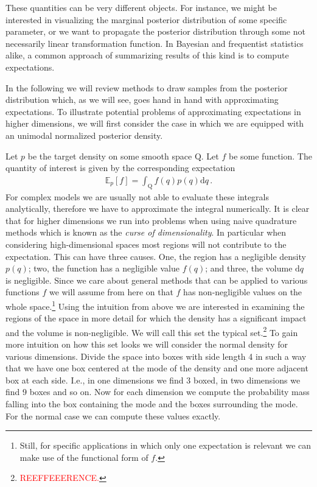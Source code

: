 \newpage
These quantities can be very different objects.
For instance, we might be interested in visualizing the marginal posterior distribution
of some specific parameter, or we want to propagate the posterior distribution
through some not necessarily linear transformation function.
In Bayesian and frequentist statistics alike, a common approach of summarizing
results of this kind is to compute expectations.

In the following we will review methods to draw samples from the posterior
distribution which, as we will see, goes hand in hand with approximating expectations.
To illustrate potential problems of approximating expectations in higher dimensions,
we will first consider the case in which we are equipped with an unimodal normalized posterior density.

Let $p$ be the target density on some smooth space $\mathrm{Q}$.
Let $f$ be some function.
The quantity of interest is given by the corresponding expectation
\begin{align}
    \mathbb{E}_p \left[f\right] = \int_{\mathrm{Q}} f(q) p(q) \mathrm{d}q \,.
\end{align}
For complex models we are usually not able to evaluate these integrals analytically,
therefore we have to approximate the integral numerically.
It is clear that for higher dimensions we run into problems when using naive
quadrature methods which is known as the \emph{curse of dimensionality}.
In particular when considering high-dimensional spaces most regions will not
contribute to the expectation. This can have three causes. One, the region has a
negligible density $p(q)$; two, the function has a negligible value $f(q)$;
and three, the volume $\mathrm{d}q$ is negligible. Since we care about general
methods that can be applied to various functions $f$ we will assume from here on
that $f$ has non-negligible values on the whole space.\footnote{Still, for specific applications
in which only one expectation is relevant we can make use of the functional form of
$f$.}
Using the intuition from above we are interested in examining the regions of the
space in more detail for which the density has a significant impact and the
volume is non-negligible. We will call this set the typical set.\footnote{\textcolor{red}{REEFFEEERENCE.}}
To gain more intuition on how this set looks we will consider the normal density
for various dimensions. Divide the space into boxes with
side length 4 in such a way that we have one box centered at the mode of the
density and one more adjacent box at each side. I.e., in one dimensions we
find 3 boxed, in two dimensions we find 9 boxes and so on. Now for each dimension
we compute the probability mass falling into the box containing the mode and the
boxes surrounding the mode. For the normal case we can compute these values exactly.


